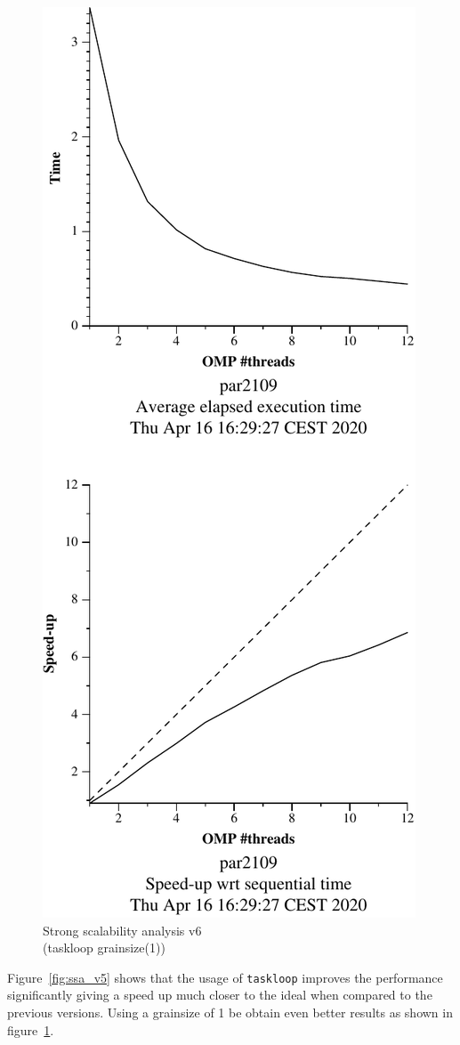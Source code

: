 \begin{figure}[H]
\begin{minipage}{0.5\textwidth}
        \includegraphics[width=0.7\linewidth]{plots/v6-crop.pdf}
        \caption{Strong scalability analysis v6 \\ (taskloop grainsize(1))}
        \label{fig:ssa_v6} 
    \end{minipage}
\end{figure}

Figure~\ref{fig:ssa_v5} shows that the usage of \texttt{taskloop} improves the performance significantly giving a
speed up much closer to the ideal when compared to the previous versions. Using a grainsize of 1 be obtain even
better results as shown in figure~\ref{fig:ssa_v6}.


